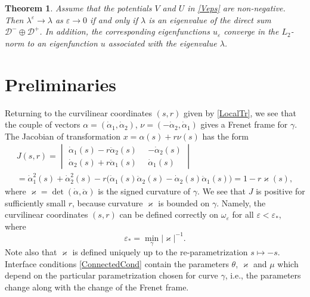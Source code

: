 \documentclass[reqno]{amsart}
\theoremstyle{plain}
\newtheorem{thm}{Theorem}
\numberwithin{equation}{section}
\renewcommand{\kappa}{\varkappa}
\newcommand{\eps}{\varepsilon}
\newcommand{\lme}{\lambda^\eps}
\begin{document}
\begin{thm}\label{MainThrmVUPos}
Assume that the potentials $V$ and $U$ in \eqref{Veps} are non-negative.
Then $\lme \to \lambda$  as $\eps\to 0$ if and only if $\lambda$ is an eigenvalue of the direct sum $\mathcal{D}^-\oplus\mathcal{D}^+$. In addition,  the corresponding eigenfunctions $u_\eps$ converge in the $L_2$-norm to an eigenfunction $u$ associated with the eigenvalue $\lambda$.
\end{thm}









\section{Preliminaries}
Returning  to the curvilinear coordinates $(s,r)$ given by \eqref{LocalTr},
we see that the couple of vectors
$ \alpha=(\dot{\alpha}_1, \dot{\alpha}_2)$, $\nu=(-\dot{\alpha}_2, \dot{\alpha}_1)$
gives a Frenet frame for $\gamma$.
The Jacobian of transformation $x=\alpha(s)+r\nu(s)$ has the form
\begin{multline*}
J(s,r)=
\begin{vmatrix}
  \dot{\alpha}_1(s)-r\ddot{\alpha}_2(s)& -\dot{\alpha}_2(s)\\
          \dot{\alpha}_2(s)+r\ddot{\alpha}_1(s)\phantom{0} & \dot{\alpha}_1(s)
\end{vmatrix}
\\
=\dot{\alpha}_1^2(s)+\dot{\alpha}_2^2(s)
-r\big(\dot{\alpha}_1(s)\ddot{\alpha}_2(s)-
  \dot{\alpha}_2(s)\ddot{\alpha}_1(s)\big)=1-r \kappa(s),
\end{multline*}
where $\kappa=\det(\dot{\alpha},\ddot{\alpha})$ is the signed curvature of $\gamma$.
We see that $J$ is positive for sufficiently small $r$, because  curvature $\kappa$  is  bounded on $\gamma$.
Namely, the curvilinear coordinates $(s,r)$ can be defined correctly on  $\omega_\eps$ for all $\eps<\eps_*$, where
\begin{equation}\label{EpsStar}
	\eps_*=\min_{\gamma}|\kappa|^{-1}.
\end{equation}
Note also that $\kappa$ is defined uniquely up to the re-parametrization $s\mapsto-s$.
Interface conditions \eqref{ConnectedCond} contain the parameters $\theta$, $\kappa$ and $\mu$ which depend on the particular parametrization chosen for curve $\gamma$, i.e., the parameters change along with the change of the Frenet frame.
\end{document}

